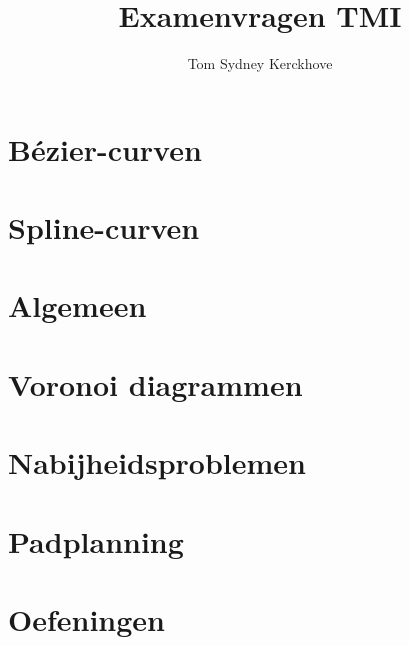 \documentclass[12pt,a4paper]{article}
\author{Tom Sydney Kerckhove}
\title{Examenvragen TMI}
\begin{document}
\pagebreak





\part{B\'ezier-curven}








\part{Spline-curven}






\part{Algemeen}






\part{Voronoi diagrammen}






\iffalse
\section{Bewijs: "Twee dichtste buren hebben een gemeenschappelijke voronoi zijde"}
\fi

\part{Nabijheidsproblemen}



\part{Padplanning}


\part{Oefeningen}











\end{document}
